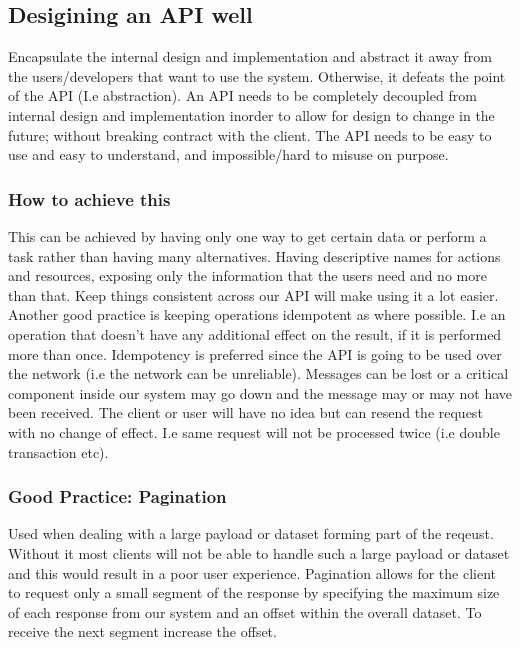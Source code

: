 \documentclass[a4paper, 11pt]{book}
\begin{document}
    \subsection{Desigining an API well}
    Encapsulate the internal design and implementation and abstract it away from the users/developers that want to use the system.
    Otherwise, it defeats the point of the API (I.e abstraction).
    An API needs to be completely decoupled from internal design and implementation inorder to allow for design to change in the future; without breaking contract with the client.
    The API needs to be easy to use and easy to understand, and impossible/hard to misuse on purpose.

    \subsubsection{How to achieve this}
    This can be achieved by having only one way to get certain data or perform a task rather than having many alternatives.
    Having descriptive names for actions and resources, exposing only the information that the users need and no more than that.
    Keep things consistent across our API will make using it a lot easier.
    Another good practice is keeping operations idempotent as where possible.
    I.e an operation that doesn't have any additional effect on the result, if it is performed more than once.
    Idempotency is preferred since the API is going to be used over the network (i.e the network can be unreliable).
    Messages can be lost or a critical component inside our system may go down and the message may or may not have been received.
    The client or user will have no idea but can resend the request with no change of effect.
    I.e same request will not be processed twice (i.e double transaction etc).

    \subsubsection{Good Practice: Pagination}
    Used when dealing with a large payload or dataset forming part of the reqeust.
    Without it most clients will not be able to handle such a large payload or dataset and this would result in a poor user experience.
    Pagination allows for the client to request only a small segment of the response by specifying the maximum size of each response from our system
    and an offset within the overall dataset.
    To receive the next segment increase the offset.
\end{document}
